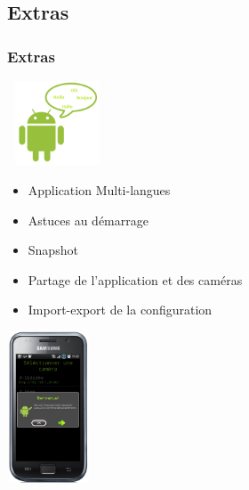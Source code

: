 \subsection{Extras}
\begin{frame}
\frametitle{Extras}
\includegraphics[width=3cm, height=2.5cm]{Images/ImageSlide11-3.png}\\
\begin{minipage}{0.69\textwidth}
\begin{itemize}
  \item Application Multi-langues
  \item Astuces au démarrage
  \item Snapshot
  \item Partage de l'application et des caméras
  \item Import-export de la configuration
\end{itemize}
\end{minipage}
\begin{minipage}{0.29\textwidth}
\includegraphics[width=2.5cm, height=4.5cm]{Images/ImageSlide11-3a.png}
\end{minipage}
\end{frame}